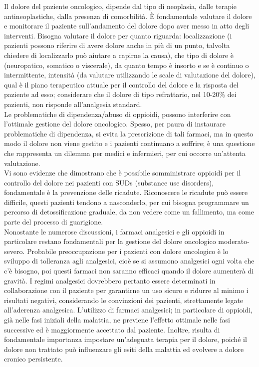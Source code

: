 Il dolore del paziente oncologico, dipende dal tipo di neoplasia, dalle terapie antineoplastiche, 
dalla presenza di comorbilità. È fondamentale valutare il dolore e monitorare il paziente sull’andamento 
del dolore dopo aver messo in atto degli interventi. Bisogna valutare il dolore per quanto riguarda: 
localizzazione (i pazienti possono riferire di avere dolore anche in più di un punto, talvolta chiedere di 
localizzarlo può aiutare a capirne la causa), che tipo di dolore è (neuropatico, somatico o viscerale), 
da quanto tempo è insorto e se è continuo o intermittente, intensità (da valutare utilizzando le scale 
di valutazione del dolore), qual è il piano terapeutico attuale per il controllo del dolore e la risposta 
del paziente ad esso; considerare che il dolore di tipo refrattario, nel 10-20\% dei pazienti, 
non risponde all’analgesia standard\cite{CANCERPAINONS}.\\
Le problematiche di dipendenza/abuso di oppioidi, possono interferire con l’ottimale gestione del dolore oncologico. 
Spesso, per paura di instaurare problematiche di dipendenza, si evita la prescrizione di tali farmaci, 
ma in questo modo il dolore non viene gestito e i pazienti continuano a soffrire; 
è una questione che rappresenta un dilemma per medici e infermieri, per cui occorre un’attenta valutazione\cite{PAINONS}.\\ 
Vi sono evidenze che dimostrano che è possibile somministrare oppioidi per il controllo del dolore nei pazienti con SUDs 
(substance use disorders), fondamentale è la prevenzione delle ricadute. Riconoscere le ricadute può essere difficile, 
questi pazienti tendono a nasconderlo, per cui bisogna programmare un percorso di detossificazione graduale, 
da non vedere come un fallimento, ma come parte del processo di guarigione\cite{CANCERPAINONS}.\\
Nonostante le numerose discussioni, i farmaci analgesici e gli oppioidi in particolare restano fondamentali per 
la gestione del dolore oncologico moderato-severo. Probabile preoccupazione per i pazienti con dolore oncologico 
è lo sviluppo di tolleranza agli analgesici, cioè se si assumono analgesici ogni volta che c’è bisogno, poi questi 
farmaci non saranno efficaci quando il dolore aumenterà di gravità. I regimi analgesici dovrebbero pertanto essere 
determinati in collaborazione con il paziente per garantirne un uso sicuro e ridurre al minimo i risultati negativi, 
considerando le convinzioni dei pazienti, strettamente legate all’aderenza analgesica\cite{analgesici}. L’utilizzo di 
farmaci analgesici; in particolare di oppioidi, già nelle fasi iniziali della malattia, ne previene l’effetto ottimale 
nelle fasi successive ed è maggiormente accettato dal paziente. Inoltre, risulta di fondamentale importanza impostare 
un’adeguata terapia per il dolore, poiché il dolore non trattato può influenzare gli esiti della malattia ed evolvere 
a dolore cronico persistente. 


